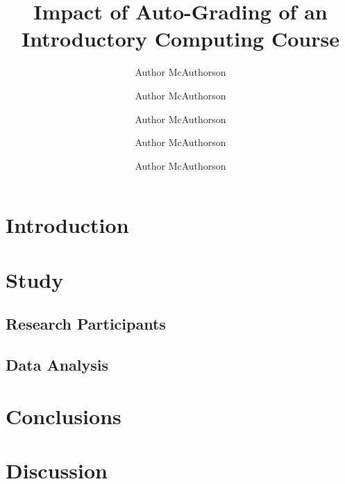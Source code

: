 \documentclass[12pt]{amsart}
\title{Impact of Auto-Grading of an Introductory Computing Course}
\author{Author McAuthorson \and Author McAuthorson \and Author McAuthorson \and Author McAuthorson \and Author McAuthorson}
\begin{document}
\maketitle

\section{Introduction} %
\section{Study} %
\subsection{Research Participants}  %
\subsection{Data Analysis}  %
\section{Conclusions}
\section{Discussion}
\end{document}

